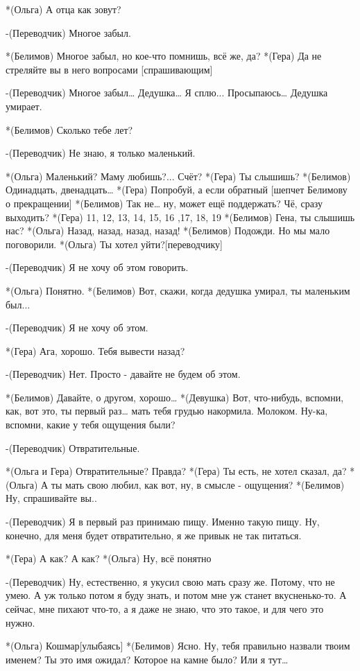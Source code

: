 *(Ольга) А отца как зовут?

-(Переводчик) Многое забыл.

*(Белимов) Многое забыл, но кое-что помнишь, всё же, да?
*(Гера) Да не стреляйте вы  в него вопросами [спрашивающим]

-(Переводчик) Многое забыл…  Дедушка… Я сплю... Просыпаюсь… Дедушка умирает.

*(Белимов) Сколько тебе лет?

-(Переводчик) Не знаю, я только маленький.

*(Ольга) Маленький? Маму любишь?... Счёт?
*(Гера) Ты слышишь?
*(Белимов) Одинадцать, двенадцать…
*(Гера) Попробуй, а если обратный [шепчет Белимову о прекращении]
*(Белимов) Так не… ну, может ещё поддержать? Чё, сразу выходить?
*(Гера) 11, 12, 13, 14, 15, 16 ,17, 18, 19
*(Белимов) Гена, ты слышишь нас?
*(Ольга) Назад, назад, назад, назад!
*(Белимов) Подожди. Но мы мало поговорили.
*(Ольга) Ты хотел уйти?[переводчику]

-(Переводчик) Я не хочу об этом говорить.

*(Ольга) Понятно.
*(Белимов) Вот, скажи, когда дедушка умирал, ты маленьким был...

-(Переводчик) Я не хочу об этом.

*(Гера) Ага, хорошо. Тебя вывести назад?

-(Переводчик) Нет. Просто - давайте не будем об этом.

*(Белимов) Давайте, о другом, хорошо…
*(Девушка) Вот, что-нибудь, вспомни, как, вот это, ты первый раз… мать тебя грудью накормила. Молоком. Ну-ка, вспомни, какие у тебя ощущения были?

-(Переводчик) Отвратительные.

*(Ольга и Гера) Отвратительные? Правда?
*(Гера) Ты есть, не хотел сказал, да?
*(Ольга) А ты мать свою любил, как вот, ну, в смысле - ощущения?
*(Белимов) Ну, спрашивайте вы..

-(Переводчик) Я в первый раз принимаю пищу. Именно такую пищу. Ну, конечно, для меня будет отвратительно, я же привык не так питаться.

*(Гера) А как? А как?
*(Ольга) Ну, всё понятно

-(Переводчик) Ну, естественно, я укусил свою мать сразу же. Потому, что не умею. А уж только потом я буду знать, и потом мне уж станет вкусненько-то. А сейчас, мне пихают что-то, а я даже не знаю, что это такое, и для чего это нужно.

*(Ольга) Кошмар[улыбаясь]
*(Белимов) Ясно. Ну, тебя правильно назвали твоим именем? Ты это имя ожидал? Которое на камне было? Или я тут…

